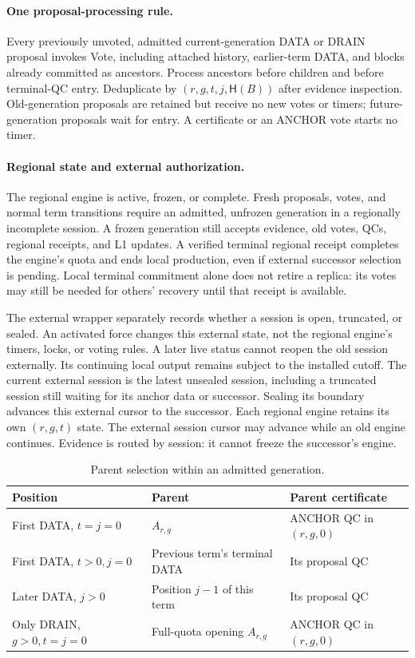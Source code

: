 \documentclass[11pt,a4paper]{article}
\newcommand{\Hash}{\mathsf H}
\begin{document}
\paragraph{One proposal-processing rule.}
Every previously unvoted, admitted current-generation DATA or DRAIN
proposal invokes Vote, including attached history, earlier-term DATA,
and blocks already committed as ancestors. Process ancestors before
children and before terminal-QC entry. Deduplicate by
$(r,g,t,j,\Hash(B))$ after evidence inspection. Old-generation proposals
are retained but receive no new votes or timers; future-generation
proposals wait for entry. A certificate or an ANCHOR vote starts no timer.

\paragraph{Regional state and external authorization.}
The regional engine is active, frozen, or complete. Fresh proposals,
votes, and normal term transitions require an admitted, unfrozen
generation in a regionally incomplete session. A frozen generation
still accepts evidence, old votes, QCs, regional receipts, and L1 updates.
A verified terminal regional receipt completes the engine's quota and
ends local production, even if external successor selection is pending.
Local terminal commitment alone does not retire a replica: its votes
may still be needed for others' recovery until that receipt is available.

The external wrapper separately records whether a session is open,
truncated, or sealed. An activated force changes this external state,
not the regional engine's timers, locks, or voting rules. A later live
status cannot reopen the old session externally. Its continuing local
output remains subject to the installed cutoff.
The current external session is the latest unsealed session, including
a truncated session still waiting for its anchor data or successor.
Sealing its boundary advances this external cursor to the successor.
Each regional engine retains its own $(r,g,t)$ state. The external
session cursor may advance while an old engine continues. Evidence is
routed by session: it cannot freeze the successor's engine.

\begin{table}[htbp]\centering\small
\caption{Parent selection within an admitted generation.}
\label{tab:parent}
\begin{tabularx}{\linewidth}{@{}p{.32\linewidth}Y Y@{}}
\toprule
Position & Parent & Parent certificate\\
\midrule
First DATA, $t=j=0$ & $A_{r,g}$ & ANCHOR QC in $(r,g,0)$\\
First DATA, $t>0,j=0$ & Previous term's terminal DATA & Its proposal QC\\
Later DATA, $j>0$ & Position $j-1$ of this term & Its proposal QC\\
Only DRAIN, $g>0,t=j=0$ & Full-quota opening $A_{r,g}$ & ANCHOR QC in $(r,g,0)$\\
\bottomrule
\end{tabularx}
\end{table}
\end{document}
